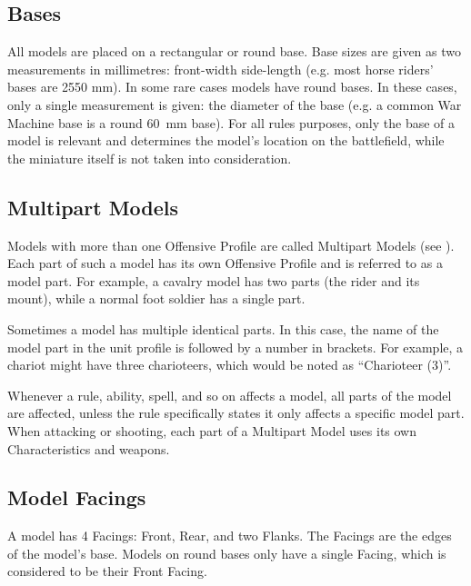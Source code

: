 \subsection{Bases}
\label{bases}

All models are placed on a rectangular or round base. Base sizes are given as two measurements in millimetres: front-width \timess{} side-length (e.g. most horse riders' bases are \num{25}\timess{}\num{50} \si{\milli\meter}). In some rare cases models have round bases. In these cases, only a single measurement is given: the diameter of the base (e.g. a common War Machine base is a round \SI{60}{\milli\meter} base). For all rules purposes, only the base of a model is relevant and determines the model's location on the battlefield, while the miniature itself is not taken into consideration.

\subsection{Multipart Models}
\label{multipart_models}

Models with more than one Offensive Profile are called Multipart Models (see ). Each part of such a model has its own Offensive Profile and is referred to as a model part. For example, a cavalry model has two parts (the rider and its mount), while a normal foot soldier has a single part.

Sometimes a model has multiple identical parts. In this case, the name of the model part in the unit profile is followed by a number in brackets. For example, a chariot might have three charioteers, which would be noted as \enquote{Charioteer (3)}.

Whenever a rule, ability, spell, and so on affects a model, all parts of the model are affected, unless the rule specifically states it only affects a specific model part. When attacking or shooting, each part of a Multipart Model uses its own Characteristics and weapons.

\subsection{Model Facings}
\label{model_facings}

A model has 4 Facings: Front, Rear, and two Flanks. The Facings are the edges of the model's base. Models on round bases only have a single Facing, which is considered to be their Front Facing.

